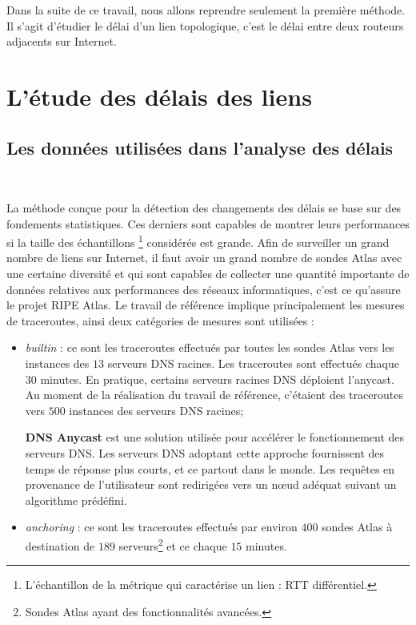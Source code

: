 Dans la suite de ce travail, nous allons reprendre seulement la première méthode.  Il s'agit d'étudier le délai d'un lien topologique, c'est le délai entre deux routeurs adjacents sur Internet.
 

\section{L'étude des délais des liens }
 
\subsection{Les données utilisées dans l'analyse des délais}~

La méthode conçue pour la détection des changements des délais se base sur des fondements statistiques. Ces derniers sont capables de montrer leurs performances si la taille des échantillons \footnote{L'échantillon de la métrique qui caractérise un lien : RTT différentiel.} considérés est grande.   Afin de surveiller un grand nombre de liens sur Internet, il faut avoir un grand nombre de sondes Atlas avec une certaine diversité et  qui sont capables de collecter une quantité importante de données relatives aux performances des réseaux informatiques, c'est ce qu'assure le projet RIPE Atlas. Le travail de référence implique principalement les mesures de traceroutes, ainsi deux catégories de mesures sont utilisées :

\begin{itemize}
	\item \textit{builtin} : ce sont les traceroutes effectués par toutes les sondes Atlas vers les instances des  $13$ serveurs DNS racines. Les traceroutes sont effectués chaque $30$ minutes. En pratique, certains serveurs racines DNS déploient l'anycast. Au moment de la réalisation du travail de référence, c'étaient des traceroutes vers $ 500 $ instances des serveurs DNS racines;
	\begin{tcolorbox}
		 \textbf{DNS Anycast} est une solution   utilisée pour accélérer le fonctionnement  des serveurs DNS. Les serveurs DNS adoptant cette approche fournissent des temps de réponse plus courts, et ce partout dans le monde. Les requêtes en provenance de l'utilisateur sont redirigées vers un n\oe{}ud adéquat suivant un algorithme prédéfini. 
	\end{tcolorbox}
	
	\item \textit{anchoring} : ce sont les traceroutes effectués par environ $400$ sondes Atlas à destination de $189$ serveurs\footnote{Sondes Atlas ayant des fonctionnalités avancées.} et ce chaque $15$ minutes.
\end{itemize}

